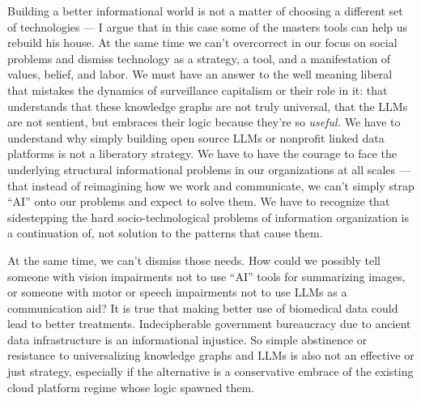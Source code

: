 \documentclass{article}
\begin{document}
Building a better informational world is not a matter of choosing a
different set of technologies --- I argue that in this case some of the
masters tools can help us rebuild his house. At the same time we can't
overcorrect in our focus on social problems and dismiss technology as a
strategy, a tool, and a manifestation of values, belief, and labor. We
must have an answer to the well meaning liberal that mistakes the
dynamics of surveillance capitalism or their role in it: that
understands that these knowledge graphs are not truly universal, that
the LLMs are not sentient, but embraces their logic because they're so
\emph{useful.} We have to understand why simply building open source
LLMs or nonprofit linked data platforms is not a liberatory strategy. We
have to have the courage to face the underlying structural informational
problems in our organizations at all scales --- that instead of
reimagining how we work and communicate, we can't simply strap ``AI''
onto our problems and expect to solve them. We have to recognize that
sidestepping the hard socio-technological problems of information
organization is a continuation of, not solution to the patterns that
cause them.

At the same time, we can't dismiss those needs. How could we possibly
tell someone with vision impairments not to use ``AI'' tools for
summarizing images, or someone with motor or speech impairments not to
use LLMs as a communication aid? It is true that making better use of
biomedical data could lead to better treatments. Indecipherable
government bureaucracy due to ancient data infrastructure is an
informational injustice. So simple abstinence or resistance to
universalizing knowledge graphs and LLMs is also not an effective or
just strategy, especially if the alternative is a conservative embrace
of the existing cloud platform regime whose logic spawned them.
\end{document}
